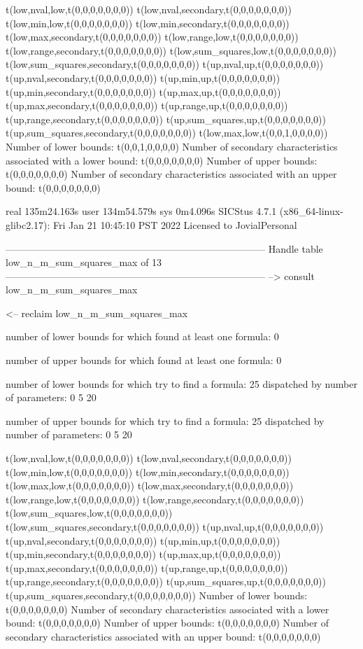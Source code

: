 t(low,nval,low,t(0,0,0,0,0,0,0))
t(low,nval,secondary,t(0,0,0,0,0,0,0))
t(low,min,low,t(0,0,0,0,0,0,0))
t(low,min,secondary,t(0,0,0,0,0,0,0))
t(low,max,secondary,t(0,0,0,0,0,0,0))
t(low,range,low,t(0,0,0,0,0,0,0))
t(low,range,secondary,t(0,0,0,0,0,0,0))
t(low,sum_squares,low,t(0,0,0,0,0,0,0))
t(low,sum_squares,secondary,t(0,0,0,0,0,0,0))
t(up,nval,up,t(0,0,0,0,0,0,0))
t(up,nval,secondary,t(0,0,0,0,0,0,0))
t(up,min,up,t(0,0,0,0,0,0,0))
t(up,min,secondary,t(0,0,0,0,0,0,0))
t(up,max,up,t(0,0,0,0,0,0,0))
t(up,max,secondary,t(0,0,0,0,0,0,0))
t(up,range,up,t(0,0,0,0,0,0,0))
t(up,range,secondary,t(0,0,0,0,0,0,0))
t(up,sum_squares,up,t(0,0,0,0,0,0,0))
t(up,sum_squares,secondary,t(0,0,0,0,0,0,0))
t(low,max,low,t(0,0,1,0,0,0,0))
Number of lower bounds:                                             t(0,0,1,0,0,0,0)
Number of secondary characteristics associated with a lower bound:  t(0,0,0,0,0,0,0)
Number of upper bounds:                                             t(0,0,0,0,0,0,0)
Number of secondary characteristics associated with an upper bound: t(0,0,0,0,0,0,0)

real	135m24.163s
user	134m54.579s
sys	0m4.096s
SICStus 4.7.1 (x86_64-linux-glibc2.17): Fri Jan 21 10:45:10 PST 2022
Licensed to JovialPersonal


--------------------------------------------------------------------------------
Handle table low_n_m_sum_squares_max of 13
--------------------------------------------------------------------------------
--> consult low_n_m_sum_squares_max

<-- reclaim low_n_m_sum_squares_max

number of lower bounds for which found at least one formula: 0

number of upper bounds for which found at least one formula: 0

number of lower bounds for which try to find a formula: 25
dispatched by number of parameters: 0  5  20

number of upper bounds for which try to find a formula: 25
dispatched by number of parameters: 0  5  20

t(low,nval,low,t(0,0,0,0,0,0,0))
t(low,nval,secondary,t(0,0,0,0,0,0,0))
t(low,min,low,t(0,0,0,0,0,0,0))
t(low,min,secondary,t(0,0,0,0,0,0,0))
t(low,max,low,t(0,0,0,0,0,0,0))
t(low,max,secondary,t(0,0,0,0,0,0,0))
t(low,range,low,t(0,0,0,0,0,0,0))
t(low,range,secondary,t(0,0,0,0,0,0,0))
t(low,sum_squares,low,t(0,0,0,0,0,0,0))
t(low,sum_squares,secondary,t(0,0,0,0,0,0,0))
t(up,nval,up,t(0,0,0,0,0,0,0))
t(up,nval,secondary,t(0,0,0,0,0,0,0))
t(up,min,up,t(0,0,0,0,0,0,0))
t(up,min,secondary,t(0,0,0,0,0,0,0))
t(up,max,up,t(0,0,0,0,0,0,0))
t(up,max,secondary,t(0,0,0,0,0,0,0))
t(up,range,up,t(0,0,0,0,0,0,0))
t(up,range,secondary,t(0,0,0,0,0,0,0))
t(up,sum_squares,up,t(0,0,0,0,0,0,0))
t(up,sum_squares,secondary,t(0,0,0,0,0,0,0))
Number of lower bounds:                                             t(0,0,0,0,0,0,0)
Number of secondary characteristics associated with a lower bound:  t(0,0,0,0,0,0,0)
Number of upper bounds:                                             t(0,0,0,0,0,0,0)
Number of secondary characteristics associated with an upper bound: t(0,0,0,0,0,0,0)

